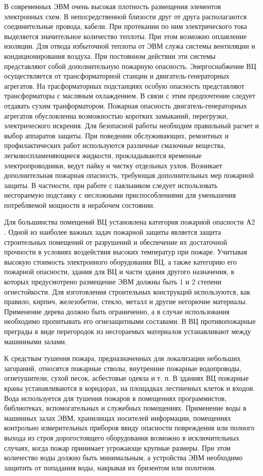 В современных ЭВМ очень высокая плотность размещения элементов электронных схем. В непосредственной близости
друг от друга располагаются соединительные провода, кабели. При протекании по ним электрического тока выделяется
значительное количество теплоты. При этом возможно оплавление изоляции. Для отвода избыточной теплоты от ЭВМ служа
системы вентиляции и кондиционирования воздуха. При постоянном действии эти системы представляют собой дополнительную
пожарную опасность. Энергоснабжение ВЦ осуществляется от трансформаторной станции и двигатель-генераторных агрегатов.
На трасформаторных подстанциях особую опасность представляют трансформаторы с масляным охлаждением. В связи с этим
предпочтение следует отдавать сухим транформатором. Пожарная опасность двигатель-генераторных агрегатов обусловленна
возможностью коротких замыканий, перегрузки, электрического искрения. Для безопасной работы необходим правильный
расчет и выбор аппаратов защиты. При поведении обслуживающих, ремонтных и профилактических работ используются
различные смазочные вещества, легковоспламеняющиеся жидкости, прокладываются временные электропроводники, ведут пайку
и чистку отдельных узлов. Возникает дополнительная пожарная опасность, требующая дополнительных мер пожарной защиты.
В частности, при работе с паяльником следует использовать несгораемую подставку с несложными приспособлениями
для уменьшения потребляемой мощности в нерабочем состоянии.

Для большинства помещений ВЦ установлена категория пожарной опасности А2 \cite{sec41}. Одной из наиболее важных задач пожарной защиты
является защита строительных помещений от разрушений и обеспечение их достаточной прочности в условиях воздействия
высоких температур при пожаре. Учитывая высокую стоимость электронного оборудования ВЦ, а также категорию его
пожарной опасности, здания для ВЦ и части здания другого назначения, в которых предусмотрено размещение ЭВМ должны
быть 1 и 2 степени огнестойкости. Для изготовления строительных конструкций используются, как правило, кирпич,
железобетон, стекло, металл и другие негорючие материалы. Применение дерева должно быть ограниченно, а в
случае использования необходимо пропитывать его огнезащитными составами. В ВЦ противопожарные преграды в виде
перегородок из несгораемых материалов устанавливают между машинными залами.

К средствам тушения пожара, предназначенных для локализации небольших загораний, относятся пожарные стволы,
внутренние пожарные водопроводы, огнетушители, сухой песок, асбестовые одеяла и т. п. В зданиях ВЦ пожарные
краны устанавливаются в коридорах, на площадках лестничных клеток и входов. Вода используется для тушения пожаров
в помещениях программистов, библиотеках, вспомогательных и служебных помещениях. Применение воды в машинных залах
ЭВМ, хранилищах носителей информации, помещениях контрольно измерительных приборов ввиду опасности повреждения или
полного выхода из строя дорогостоящего оборудования возможно в исключительных случаях, когда пожар принимает
угрожающе крупные размеры. При этом количество воды должно быть минимальным, а устройства ЭВМ необходимо защитить
от попадания воды, накрывая их бризентом или полотном.

